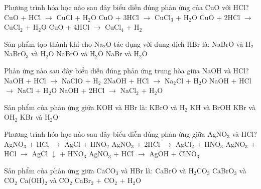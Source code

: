 \documentclass[Main.tex]{subfiles}
\begin{document}
    \begin{ex}
    Phương trình hóa học nào sau đây biểu diễn đúng phản ứng của CuO với HCl?
    \choice
    {CuO + HCl $\rightarrow$ CuCl + H$_2$O}
    {CuO + 3HCl $\rightarrow$ CuCl$_3$ + H$_2$O}
    {\True CuO + 2HCl $\rightarrow$ CuCl$_2$ + H$_2$O}
    {CuO + 4HCl $\rightarrow$ CuCl$_4$ + H$_2$}
    \end{ex}
    
    \begin{ex}
    Sản phẩm tạo thành khi cho Na$_2$O tác dụng với dung dịch HBr là:
    \choice
    {NaBrO và H$_2$}
    {NaBrO$_3$ và H$_2$O}
    {NaBrO và H$_2$O}
    {\True NaBr và H$_2$O}
    \end{ex}
    
    \begin{ex}
    Phản ứng nào sau đây biểu diễn đúng phản ứng trung hòa giữa NaOH và HCl?
    \choice
    {NaOH + HCl $\rightarrow$ NaClO + H$_2$}
    {2NaOH + HCl $\rightarrow$ Na$_2$Cl + H$_2$O}
    {\True NaOH + HCl $\rightarrow$ NaCl + H$_2$O}
    {NaOH + 2HCl $\rightarrow$ NaCl$_2$ + H$_2$O}
    \end{ex}
    
    \begin{ex}
    Sản phẩm của phản ứng giữa KOH và HBr là:
    \choice
    {KBrO và H$_2$}
    {KH và BrOH}
    {KBr và OH$_2$}
    {\True KBr và H$_2$O}
    \end{ex}
    
    \begin{ex}
    Phương trình hóa học nào sau đây biểu diễn đúng phản ứng giữa AgNO$_3$ và HCl?
    \choice
    {AgNO$_3$ + HCl $\rightarrow$ AgCl + HNO$_2$}
    {AgNO$_3$ + 2HCl $\rightarrow$ AgCl$_2$ + HNO$_3$}
    {\True AgNO$_3$ + HCl $\rightarrow$ AgCl $\downarrow$ + HNO$_3$}
    {AgNO$_3$ + HCl $\rightarrow$ AgOH + ClNO$_3$}
    \end{ex}
    
    \begin{ex}
    Sản phẩm của phản ứng giữa CaCO$_3$ và HBr là:
    \choice
    {CaBrO và H$_2$CO$_3$}
    {CaBrO$_3$ và CO$_2$}
    {Ca(OH)$_2$ và CO$_2$}
    {\True CaBr$_2$ + CO$_2$ + H$_2$O}
    \end{ex}
    
\end{document}
